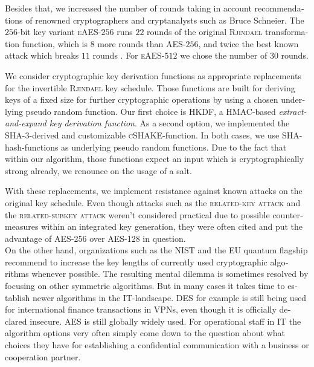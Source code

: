 \documentclass[a4paper,11pt]{article}
\begin{document}
\begin{otherlanguage}{english}
\begin{multicols}{2}

\noindent
Besides that, we increased the number of rounds taking in account recommendations of renowned cryptographers and cryptanalysts such as Bruce Schneier. The $256$-bit key variant \textsc{eAES}-$256$ runs $22$ rounds of the original \textsc{Rjindael} transformation function, which is $8$ more rounds than \textsc{AES}-$256$, and twice the best known attack which breaks $11$ rounds \cite{WEI}. For \textsc{eAES}-$512$ we chose the number of $30$ rounds. \\

\vspace{0.1cm}

\noindent
We consider cryptographic key derivation functions as appropriate replacements for the invertible \textsc{Rjindael} key schedule. Those functions are built for deriving keys of a fixed size for further cryptographic operations by using a chosen underlying pseudo random function. Our first choice is \textsc{HKDF}, a HMAC-based \textit{extract-and-expand key derivation function}. 
As a second option, we implemented the \textsc{SHA}-$3$-derived and customizable \textsc{cSHAKE}-function. In both cases, we use \textsc{SHA-}hash-functions as underlying pseudo random functions. Due to the fact that within our algorithm, those functions expect an input which is cryptographically strong already, we renounce on the usage of a salt.\\



\noindent
With these replacements, we implement resistance against known attacks on the original key schedule. Even though attacks such as the  \textsc{related-key attack} and the  \textsc{related-subkey attack} \cite{HFE} weren’t considered practical due to possible countermeasures within an integrated key generation, they were often cited and put the advantage of \textsc{AES}-256 over \textsc{AES}-128 in question. \\

\noindent
On the other hand, organizations such as the NIST and the EU quantum flagship \cite{KPN} recommend to increase the key lengths of currently used cryptographic algorithms whenever possible. The resulting mental dilemma is sometimes resolved by focusing on other symmetric algorithms. But in many cases it takes time to establish newer algorithms in the IT-landscape. \textsc{DES} for example is still being used for international finance transactions in VPNs, even though it is officially declared insecure. \textsc{AES} is still globally widely used. For operational staff in IT the algorithm options very often simply come down to the question about what choices they have for establishing a confidential communication with a business or cooperation partner. \\ 



\end{multicols}
\end{otherlanguage}
\end{document}
